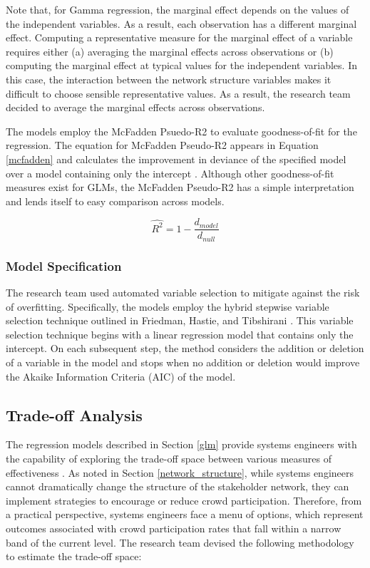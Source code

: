 Note that, for Gamma regression, the marginal effect depends on the values of the independent variables. As a result, each observation has a different marginal effect. Computing a representative measure for the marginal effect of a variable requires either (a) averaging the marginal effects across observations or (b) computing the marginal effect at typical values for the independent variables. In this case, the interaction between the network structure variables makes it difficult to choose sensible representative values. As a result, the research team decided to average the marginal effects across observations.

The models employ the McFadden Psuedo-R2 to evaluate goodness-of-fit for the regression. The equation for McFadden Pseudo-R2 appears in Equation \ref{mcfadden} and calculates the improvement in deviance of the specified model over a model containing only the intercept \cite{veall}. Although other goodness-of-fit measures exist for GLMs, the McFadden Pseudo-R2 has a simple interpretation and lends itself to easy comparison across models.

\begin{equation}
\label{mcfadden}
    \hat{R^2} = 1 - \frac{d_{model}}{d_{null}}
\end{equation}

\subsubsection{Model Specification}

The research team used automated variable selection to mitigate against the risk of overfitting. Specifically, the models employ the hybrid stepwise variable selection technique outlined in Friedman, Hastie, and Tibshirani \cite{friedman, derkson}. This variable selection technique begins with a linear regression model that contains only the intercept. On each subsequent step, the method considers the addition or deletion of a variable in the model and stops when no addition or deletion would improve the Akaike Information Criteria (AIC) of the model.

\subsection{Trade-off Analysis}
\label{trade-off}

The regression models described in Section \ref{glm} provide systems engineers with the capability of exploring the trade-off space between various measures of effectiveness \cite{parnell}. As noted in Section \ref{network_structure}, while systems engineers cannot dramatically change the structure of the stakeholder network, they can implement strategies to encourage or reduce crowd participation. Therefore, from a practical perspective, systems engineers face a menu of options, which represent outcomes associated with crowd participation rates that fall within a narrow band of the current level. The research team devised the following methodology to estimate the trade-off space:

